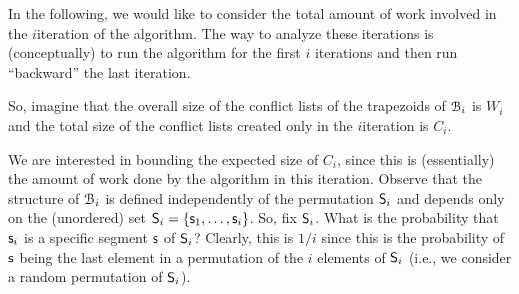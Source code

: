 In the following, we would like to consider the total amount of work
involved in the $i$\th iteration of the algorithm. The way to analyze
these iterations is (conceptually) to run the algorithm for the first
$i$ iterations and then run ``backward'' the last iteration.

So, imagine that the overall size of the conflict lists of the
trapezoids of $\EuScript{B}_i$ is $W_i$ and the total size of the conflict
lists created only in the $i$\th iteration is $C_i$.

We are interested in bounding the expected size of $C_i$, since this
is (essentially) the amount of work done by the algorithm in this
iteration. Observe that the structure of $\EuScript{B}_i$ is defined
independently of the permutation $\mathsf{S}_i$ and depends only on the
(unordered) set $\mathsf{S}_i = \left\{ {\mathsf{s}_1, \ldots, \mathsf{s}_i} \right\}$. So, fix
$\mathsf{S}_i$. What is the probability that $\mathsf{s}_i$ is a specific
segment $\mathsf{s}$ of $\mathsf{S}_i$?  Clearly, this is $1/i$ since this is
the probability of $\mathsf{s}$ being the last element in a permutation of
the $i$ elements of $\mathsf{S}_i$ (i.e., we consider a random
permutation of $\mathsf{S}_i$).

